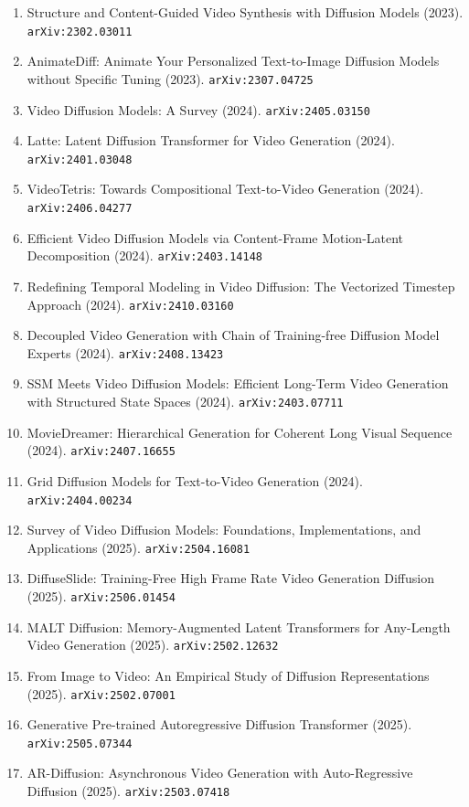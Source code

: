 \documentclass[11pt]{article}
\begin{document}
\begin{enumerate}
  \item Structure and Content-Guided Video Synthesis with Diffusion Models (2023). \texttt{arXiv:2302.03011}
  \item AnimateDiff: Animate Your Personalized Text-to-Image Diffusion Models
  without Specific Tuning (2023). \texttt{arXiv:2307.04725}
  \item Video Diffusion Models: A Survey (2024). \texttt{arXiv:2405.03150}
  \item Latte: Latent Diffusion Transformer for Video Generation (2024). \texttt{arXiv:2401.03048}
  \item VideoTetris: Towards Compositional Text-to-Video Generation (2024). \texttt{arXiv:2406.04277}
  \item Efficient Video Diffusion Models via Content-Frame Motion-Latent
  Decomposition (2024). \texttt{arXiv:2403.14148}
  \item Redefining Temporal Modeling in Video Diffusion: The Vectorized Timestep
  Approach (2024). \texttt{arXiv:2410.03160}
  \item Decoupled Video Generation with Chain of Training-free Diffusion Model
  Experts (2024). \texttt{arXiv:2408.13423}
  \item SSM Meets Video Diffusion Models: Efficient Long-Term Video Generation
  with Structured State Spaces (2024). \texttt{arXiv:2403.07711}
  \item MovieDreamer: Hierarchical Generation for Coherent Long Visual Sequence (2024). \texttt{arXiv:2407.16655}
  \item Grid Diffusion Models for Text-to-Video Generation (2024). \texttt{arXiv:2404.00234}
  \item Survey of Video Diffusion Models: Foundations, Implementations, and Applications (2025). \texttt{arXiv:2504.16081}
  \item DiffuseSlide: Training-Free High Frame Rate Video Generation Diffusion (2025). \texttt{arXiv:2506.01454}
  \item MALT Diffusion: Memory-Augmented Latent Transformers for Any-Length Video Generation (2025). \texttt{arXiv:2502.12632}
  \item From Image to Video: An Empirical Study of Diffusion Representations (2025). \texttt{arXiv:2502.07001}
  \item Generative Pre-trained Autoregressive Diffusion Transformer (2025). \texttt{arXiv:2505.07344}
  \item AR-Diffusion: Asynchronous Video Generation with Auto-Regressive
  Diffusion (2025). \texttt{arXiv:2503.07418}

\end{enumerate}
\end{document}
